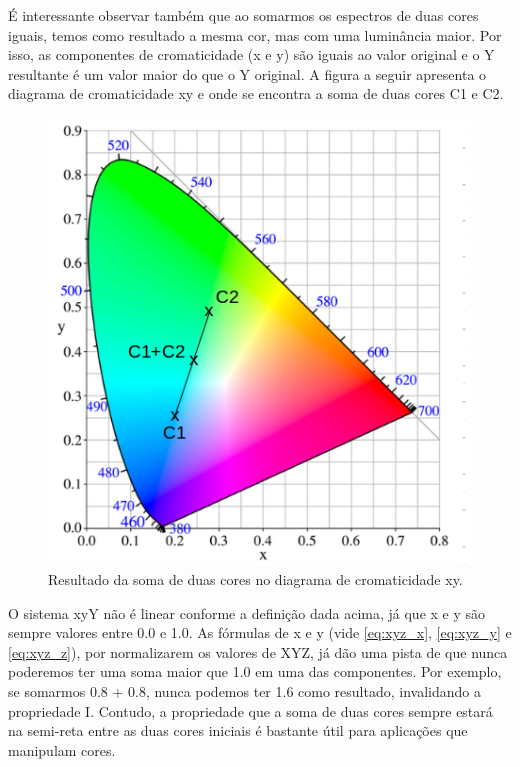\documentclass[a4paper,10pt]{report}
\begin{document}
\par
É interessante observar também que ao somarmos os espectros de duas cores
iguais, temos como resultado a mesma cor, mas com uma luminância maior. Por
isso, as componentes de cromaticidade (x e y) são iguais ao valor original e o Y
resultante é um valor maior do que o Y original. A figura a seguir apresenta o
diagrama de cromaticidade xy e onde se encontra a soma de duas cores C1 e C2.

\begin{figure}[!htb]
     \centering
\includegraphics[scale=0.6]{img/xy_linearity.png}
     \caption{Resultado da soma de duas cores no diagrama de cromaticidade xy.}
     \label{fig:XYZ_linearity_sample}
\end{figure}

\par
O sistema xyY não é linear conforme a definição dada acima, já que x e y são
sempre valores entre 0.0 e 1.0. As fórmulas de x e y (vide \ref{eq:xyz_x},
\ref{eq:xyz_y} e \ref{eq:xyz_z}), por normalizarem os valores de XYZ, já dão uma
pista de que nunca poderemos ter uma soma maior que 1.0 em uma das componentes.
Por exemplo, se somarmos 0.8 + 0.8, nunca podemos ter 1.6 como resultado,
invalidando a propriedade I. Contudo, a propriedade que a soma de duas cores
sempre estará na semi-reta entre as duas cores iniciais é bastante útil para
aplicações que manipulam cores.
\end{document}
